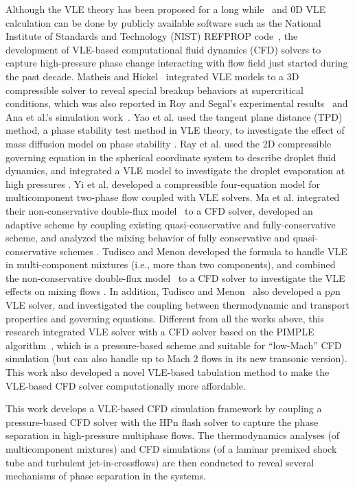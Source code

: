 Although the VLE theory has been proposed for a long while~\cite{hanks1971calculation} and 0D VLE calculation can be done by publicly available software such as the National Institute of Standards and Technology (NIST) REFPROP code~\cite{lemmon2018nist}, the development of VLE-based computational fluid dynamics (CFD) solvers to capture high-pressure phase change interacting with flow field just started during the past decade. Matheis and Hickel~\cite{matheis2018multi} integrated VLE models to a 3D compressible solver to reveal special breakup behaviors at supercritical conditions, which was also reported in Roy and Segal's experimental results~\citep{roy2010experimental} and Ana et al.'s simulation work~\citep{star2006numerical}. Yao et al. used the tangent plane distance (TPD) method, a phase stability test method in VLE theory, to investigate the effect of mass diffusion model on phase stability \citep{yao2019molecular}. Ray et al. used the 2D compressible governing equation in the spherical coordinate system to describe droplet fluid dynamics, and integrated a VLE model to investigate the droplet evaporation at high pressures \cite{ray2019two}. Yi et al. developed a compressible four-equation model for multicomponent two-phase flow coupled with VLE solvers. Ma et al. integrated their non-conservative double-flux model~\cite{ma2017entropy} to a CFD solver, developed an adaptive scheme by coupling existing quasi-conservative and fully-conservative scheme, and analyzed the mixing behavior of fully conservative and quasi-conservative schemes \citep{ma2019numerical}. Tudisco and Menon developed the formula to handle VLE in multi-component mixtures (i.e., more than two components), and combined the non-conservative double-flux model~\cite{ma2017entropy} to a CFD solver to investigate the VLE effects on mixing flows \cite{tudisco2020numerical}. In addition, Tudisco and Menon~\cite{tudisco2020vapor} also developed a p$\rho$n VLE solver, and investigated the coupling between thermodynamic and transport properties and governing equations. Different from all the works above, this research integrated VLE solver with a CFD solver based on the PIMPLE algorithm~\cite{holzmann2016mathematics}, which is a pressure-based scheme and suitable for ``low-Mach'' CFD simulation (but can also handle up to Mach 2 flows in its new transonic version). This work also developed a novel VLE-based tabulation method to make the VLE-based CFD solver computationally more affordable. 

This work develops a VLE-based CFD simulation framework by coupling a pressure-based CFD solver with the HPn flash solver to capture the phase separation in high-pressure multiphase flows. The thermodynamics analyses (of multicomponent mixtures) and CFD simulations (of a laminar premixed shock tube and turbulent jet-in-crossflows) are then conducted to reveal several mechanisms of phase separation in the  systems.

